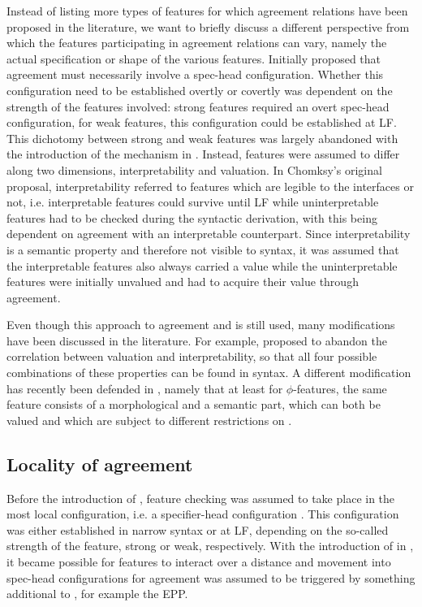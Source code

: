 \documentclass[output=paper
,modfonts
,nonflat]{langsci/langscibook}
\begin{document}
Instead of listing more types of features for which agreement relations have been proposed in the literature, we want to briefly discuss a different perspective from which the features participating in agreement relations can vary, namely the actual specification or shape of the various features. 
Initially \citep{Chomsky1995} proposed that agreement must necessarily involve a spec-head configuration. Whether this configuration need to be established overtly or covertly was dependent on the strength of the features involved: strong features required an overt spec-head configuration, for weak features, this configuration could be established at LF. This dichotomy between strong and weak features was largely abandoned with the introduction of the \agr {} mechanism in \citet{Chomsky2000,Chomsky2001}. Instead, features were assumed to differ along two dimensions, interpretability and valuation. In Chomksy's original proposal, interpretability referred to features which are legible to the interfaces or not, i.e. interpretable features could survive until LF while uninterpretable features had to be checked during the syntactic derivation, with this being dependent on agreement with an interpretable counterpart. Since interpretability is a semantic property and therefore not visible to syntax, it was assumed that the interpretable features also always carried a value while the uninterpretable features were initially unvalued and had to acquire their value through agreement.

Even though this approach  to agreement and \agr {} is still used, many modifications have been discussed in the literature. For example, \citet{pesetskytorrego2007} proposed to abandon the correlation between valuation and interpretability, so that all four possible combinations of these properties can be found in syntax.
A different modification has recently been defended in \citet{smithdiss,smithsse}, namely that at least for $\phi$-features, the same feature consists of a morphological and a semantic part, which can both be valued and which are subject to different restrictions on \agr.


\subsection{Locality of agreement}
\label{sec:locality}

Before the introduction of \agr, feature checking was assumed to take place in the most local configuration, i.e. a specifier-head configuration \citep{Chomsky1995}. This configuration was either established in narrow syntax or at LF, depending on the so-called strength of the feature, strong or weak, respectively. With the introduction of \agr {} in \citet{Chomsky2000,Chomsky2001}, it became possible for features to interact over a distance and movement into spec-head configurations for agreement was assumed to be triggered by something additional to \agr, for example the EPP.
\end{document}
